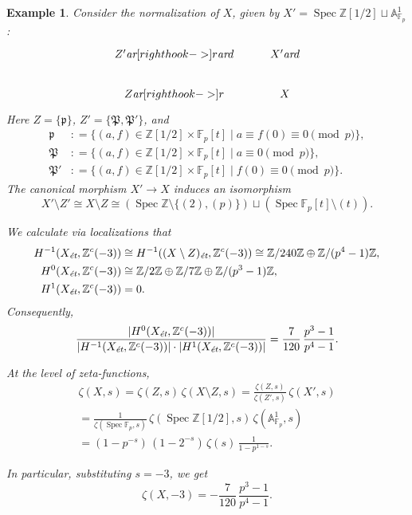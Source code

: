 \documentclass{article}
\DeclareMathOperator{\Spec}{Spec}
\newcommand{\FF}{\mathbb{F}}
\newcommand{\ZZ}{\mathbb{Z}}
\renewcommand{\AA}{\mathbb{A}}
\newcommand{\ar}{\text{\it ar}}
\newcommand{\et}{\text{\it \'{e}t}}
\newcommand{\dfn}{\mathrel{\mathop:}=}
\theoremstyle{myplain}
\theoremstyle{mydefinition}
\newtheorem{example}[theorem]{Example}
\begin{document}
\begin{example}
  Consider the normalization of $X$, given by
  $X' = \Spec \ZZ [1/2] \sqcup \AA^1_{\FF_p}$:
  \[ \begin{tikzcd}
      Z' \ar[right hook->]{r}\ar{d} & X' \ar{d} \\
      Z \ar[right hook->]{r} & X
    \end{tikzcd} \]
  Here $Z = \{ \mathfrak{p} \}$, $Z' = \{ \mathfrak{P}, \mathfrak{P}' \}$,
  and
  \begin{align*}
    \mathfrak{p} & \dfn \{ (a,f) \in \ZZ [1/2] \times \FF_p [t] \mid a \equiv f(0) \equiv 0 \pmod{p} \}, \\
    \mathfrak{P} & \dfn \{ (a,f) \in \ZZ [1/2] \times \FF_p [t] \mid a \equiv 0 \pmod{p} \}, \\
    \mathfrak{P}' & \dfn \{ (a,f) \in \ZZ [1/2] \times \FF_p [t] \mid f(0) \equiv 0 \pmod{p} \}.
  \end{align*}
  The canonical morphism $X' \to X$ induces an isomorphism
  \[ X'\setminus Z' \cong X\setminus Z \cong
    (\Spec \ZZ \setminus \{ (2), (p) \}) \sqcup
    (\Spec \FF_p [t] \setminus (t)). \]

  We calculate via localizations that
  \begin{align*}
    H^{-1} (X_\et, \ZZ^c (-3)) & \cong H^{-1} ((X\setminus Z)_\et, \ZZ^c (-3)) \cong
                                 \ZZ/240\ZZ \oplus \ZZ/(p^4 - 1)\ZZ, \\
    H^0 (X_\et, \ZZ^c (-3)) & \cong \ZZ/2\ZZ \oplus \ZZ/7\ZZ \oplus \ZZ/(p^3 - 1)\ZZ, \\
    H^1 (X_\et, \ZZ^c (-3)) & = 0.
  \end{align*}
  Consequently,
  \[ \frac{|H^0 (X_\et, \ZZ^c (-3))|}{|H^{-1} (X_\et, \ZZ^c (-3))|\cdot |H^1 (X_\et, \ZZ^c (-3))|} =
    \frac{7}{120}\,\frac{p^3-1}{p^4 - 1}. \]

  At the level of zeta-functions,
  \begin{multline*}
    \zeta (X,s) =
    \zeta (Z,s)\,\zeta (X\setminus Z,s) =
    \frac{\zeta (Z,s)}{\zeta (Z',s)}\,\zeta (X',s) \\
    = \frac{1}{\zeta (\Spec \FF_p,s)}\,\zeta (\Spec \ZZ[1/2],s)\,\zeta (\AA^1_{\FF_p},s) \\
    = (1-p^{-s})\,(1 - 2^{-s})\,\zeta (s)\,\frac{1}{1 - p^{1-s}}.
  \end{multline*}

  In particular, substituting $s = -3$, we get
  $$\zeta (X,-3) = -\frac{7}{120}\,\frac{p^3 - 1}{p^4 - 1}.$$
\end{example}


\pagebreak


\end{document}
